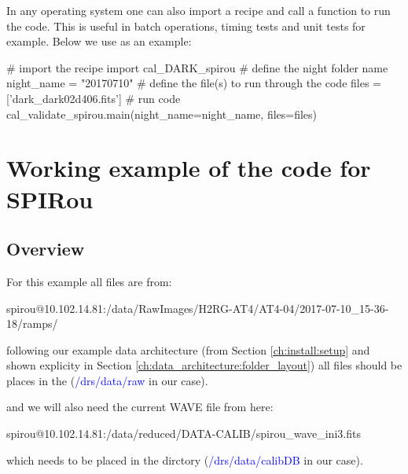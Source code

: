 In any operating system one can also import a recipe and call a function to run the code. This is useful in batch operations, timing tests and unit tests for example. Below we use \calDARK as an example:

\begin{pythonbox}
# import the recipe
import cal_DARK_spirou
# define the night folder name
night_name = "20170710"
# define the file(s) to run through the code
files = ['dark_dark02d406.fits']
# run code
cal_validate_spirou.main(night_name=night_name, files=files)
\end{pythonbox}


\section{Working example of the code for SPIRou}
\label{chapter:using_the_drs:working_example}

\subsection{Overview}
\label{chapter:using_the_drs:working_example:overview}

For this example all files are from:
\begin{cmdbox}
spirou@10.102.14.81:/data/RawImages/H2RG-AT4/AT4-04/2017-07-10_15-36-18/ramps/
\end{cmdbox} 

\noindent following our example data architecture (from Section \ref{ch:install:setup} and shown explicity in Section \ref{ch:data_architecture:folder_layout}) all files should be places in the  (\textcolor{blue}{/drs/data/raw} in our case).

\noindent and we will also need the current WAVE file from here:
\begin{cmdbox}
spirou@10.102.14.81:/data/reduced/DATA-CALIB/spirou_wave_ini3.fits
\end{cmdbox}

\noindent which needs to be placed in the  dirctory (\textcolor{blue}{/drs/data/calibDB} in our case).

